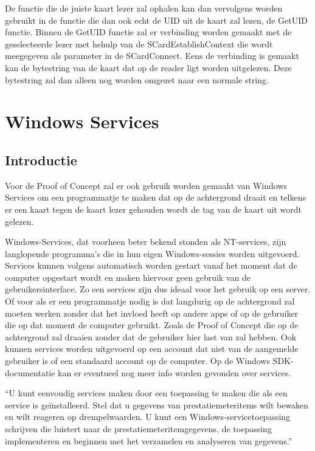 De functie die de juiste kaart lezer zal ophalen kan dan vervolgens worden gebruikt in de functie die dan ook echt de UID uit de kaart zal lezen, de GetUID functie. Binnen de GetUID functie zal er verbinding worden gemaakt met de geselecteerde lezer met hehulp van de SCardEstablishContext die wordt meegegeven als parameter in de SCardConnect. Eens de verbinding is gemaakt kan de bytestring van de kaart dat op de reader ligt worden uitgelezen. Deze bytestring zal dan alleen nog worden omgezet naar een normale string. 




\section{Windows Services }
\subsection{Introductie}
Voor de Proof of Concept zal er ook gebruik worden gemaakt van Windows Services om een programmatje te maken dat op de achtergrond draait en telkens er een kaart tegen de kaart lezer gehouden wordt de tag van de kaart uit wordt gelezen. 

Windows-Services, dat voorheen beter bekend stonden als NT-services, zijn langlopende programma's die in hun eigen Windows-sessies worden uitgevoerd. Services kunnen volgens \textcite{DevMozService} automatisch worden gestart vanaf het moment dat de computer opgestart wordt en maken hiervoor geen gebruik van de gebruikersinterface. Zo een services zijn dus ideaal voor het gebruik op een server. Of voor als er een programmatje nodig is dat langdurig op de achtergrond zal moeten werken zonder dat het invloed heeft op andere apps of op de gebruiker die op dat moment de computer gebruikt. Zoals de Proof of Concept die op de achtergrond zal draaien zonder dat de gebruiker hier last van zal hebben. Ook kunnen services worden uitgevoerd op een account dat niet van de aangemelde gebruiker is of een standaard account op de computer. Op de Windows SDK-documentatie kan er eventueel nog meer info worden gevonden over services. 

``U kunt eenvoudig services maken door een toepassing te maken die als een service is geïnstalleerd. Stel dat u gegevens van prestatiemeteritems wilt bewaken en wilt reageren op drempelwaarden. U kunt een Windows-servicetoepassing schrijven die luistert naar de prestatiemeteritemgegevens, de toepassing implementeren en beginnen met het verzamelen en analyseren van gegevens.''\autocite{DevMozService}

